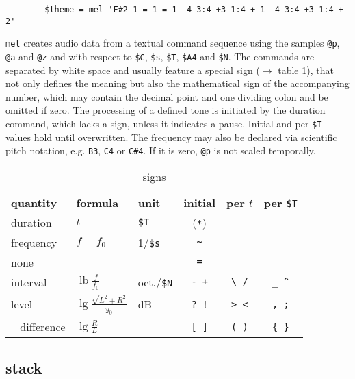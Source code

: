 \documentclass[a4paper, 10pt]{article}
\begin{document}
	\begin{verbatim}
		$theme = mel 'F#2 1 = 1 = 1 -4 3:4 +3 1:4 + 1 -4 3:4 +3 1:4 + 2'
	\end{verbatim}
	\verb|mel| creates audio data from a textual command sequence using the samples \verb|@p|, \verb|@a| and \verb|@z| and with respect to \verb|$C|, \verb|$s|, \verb|$T|, \verb|$A4| and \verb|$N|. The commands are separated by white space and usually feature a special sign ($\rightarrow$ table \ref{signs}), that not only defines the meaning but also the mathematical sign of the accompanying number, which may contain the decimal point and one dividing colon and be omitted if zero. The processing of a defined tone is initiated by the duration command, which lacks a sign, unless it indicates a pause. Initial and per \verb|$T| values hold until overwritten. The frequency may also be declared via scientific pitch notation, e.g. \verb|B3|, \verb|C4| or \verb|C#4|. If it is zero, \verb|@p| is not scaled temporally.
	\begin{table}[H]
		\centering
		\begin{tabular}
			{ l            l                                    l                c               c               c }
			{\bf quantity} & {\bf formula}                      & {\bf unit}     & {\bf initial} & {\bf per $t$} & {\bf per \verb|$T|} \\
			duration       & $t$                                & \verb|$T|      & (\verb|*|)    &               &                     \\
			frequency      & $f = f_0$                          & 1/\verb|$s|    &  \verb|~|     &               &                     \\
			none           &                                    &                &  \verb|=|     &               &                     \\
			interval       & $\operatorname{lb} \frac f {f_0}$  & oct./\verb|$N| & \verb|- +|    & \verb|\ /|    & \verb|_ ^|          \\
			level          & $\lg \frac{\sqrt{L^2 + R^2}}{y_0}$ & dB             & \verb|? !|    & \verb|> <|    & \verb|, ;|          \\
			-- difference  & $\lg \frac R L$                    & --             & \verb|[ ]|    & \verb|( )|    & \verb|{ }|
		\end{tabular}
		\caption{signs}
		\label{signs}
	\end{table}

	\subsection*{stack}
\end{document}
